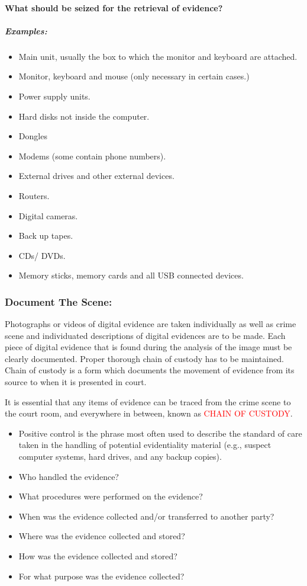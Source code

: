 \documentclass[british]{article}
\begin{document}
\paragraph{What should be seized for the retrieval of evidence?}

\subparagraph{Examples:}
\begin{itemize}
	\item Main unit, usually the box to which the monitor and keyboard are attached.
	\item Monitor, keyboard and mouse (only necessary in certain cases.)
	\item Power supply units.
	\item Hard disks not inside the computer.
	\item Dongles
	\item Modems (some contain phone numbers).
	\item External drives and other external devices.
	\item Routers.
	\item Digital cameras.
	\item Back up tapes.
	\item CDs/ DVDs.
	\item Memory sticks, memory cards and all USB connected devices.
\end{itemize}

\subsubsection{Document The Scene:}

Photographs or videos of digital evidence are taken individually as
well as crime scene and individuated descriptions of digital evidences
are to be made. Each piece of digital evidence that is found during
the analysis of the image must be clearly documented. Proper thorough
chain of custody has to be maintained. Chain of custody is a form
which documents the movement of evidence from its source to when it
is presented in court.

It is essential that any items of evidence can be traced from the
crime scene to the court room, and everywhere in between, known as
\textcolor{red}{CHAIN OF CUSTODY}.
\begin{itemize}
	\item Positive control is the phrase most often used to describe the standard
	      of care taken in the handling of potential evidentiality material
	      (e.g., suspect computer systems, hard drives, and any backup copies).
	\item Who handled the evidence?
	\item What procedures were performed on the evidence?
	\item When was the evidence collected and/or transferred to another party?
	\item Where was the evidence collected and stored?
	\item How was the evidence collected and stored?
	\item For what purpose was the evidence collected?
\end{itemize}
\end{document}
